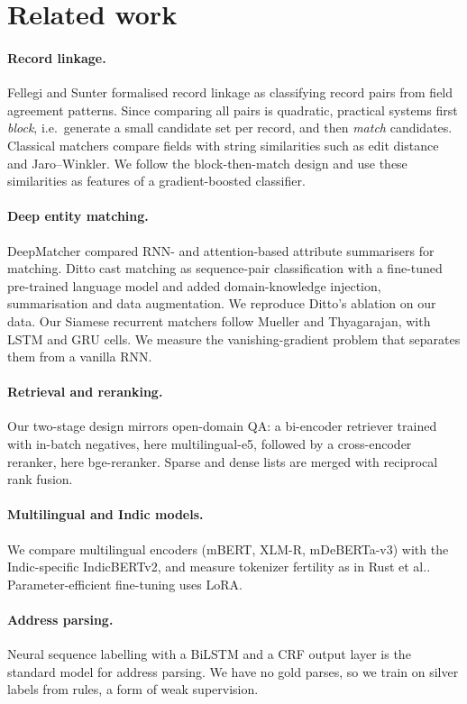 \section{Related work}
\label{sec:related}

\paragraph{Record linkage.} Fellegi and Sunter formalised record linkage as classifying record
pairs from field agreement patterns. Since comparing all pairs is quadratic, practical systems first
\emph{block}, i.e.\ generate a small candidate set per record, and then \emph{match}
candidates. Classical matchers compare fields with string
similarities such as edit distance and Jaro--Winkler.
We follow the block-then-match design and use these similarities as features of a gradient-boosted
classifier.

\paragraph{Deep entity matching.} DeepMatcher compared RNN- and attention-based
attribute summarisers for matching. Ditto cast matching as sequence-pair classification
with a fine-tuned pre-trained language model and added domain-knowledge injection, summarisation and data
augmentation. We reproduce Ditto's ablation on our data. Our Siamese recurrent
matchers follow Mueller and Thyagarajan, with LSTM and GRU
cells. We measure the vanishing-gradient problem that
separates them from a vanilla RNN.

\paragraph{Retrieval and reranking.} Our two-stage design mirrors open-domain QA: a bi-encoder retriever
trained with in-batch negatives, here multilingual-e5,
followed by a cross-encoder reranker, here bge-reranker.
Sparse and dense lists are merged with reciprocal rank fusion.

\paragraph{Multilingual and Indic models.} We compare multilingual encoders (mBERT,
XLM-R, mDeBERTa-v3) with the Indic-specific
IndicBERTv2, and measure tokenizer fertility as in Rust et al..
Parameter-efficient fine-tuning uses LoRA.

\paragraph{Address parsing.} Neural sequence labelling with a BiLSTM and a CRF output
layer is the standard model for address
parsing. We have no gold parses, so we train on silver labels from rules, a
form of weak supervision.

